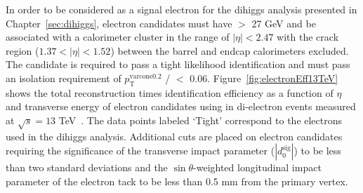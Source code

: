 In order to be considered as a signal electron for the dihiggs analysis presented in Chapter~\ref{sec:dihiggs}, electron candidates must have \pt$>$ 27 GeV and be associated with a calorimeter cluster in the range of $|\eta|< 2.47$ with the crack region ($1.37 < |\eta| < 1.52$) between the barrel and endcap calorimeters excluded. The candidate is required to pass a tight likelihood identification and must pass an isolation requirement of $p_{\text{T}}^{\text{varcone0.2}}$ / \pt $<$ 0.06. Figure~\ref{fig:electronEff13TeV} shows the total reconstruction times identification efficiency as a function of $\eta$ and transverse energy of electron candidates using in di-electron events measured at $\sqrt{s}=13$ TeV~\cite{ATLAS-CONF-2016-024}. The data points labeled `Tight' correspond to the electrons used in the dihiggs analysis. Additional cuts are placed on electron candidates requiring the significance of the transverse impact parameter ($|d_{0}^{\textrm{sig}}|$) to be less than two standard deviations and the $\sin\theta$-weighted longitudinal impact parameter of the electron tack to be less than 0.5 mm from the primary vertex.







